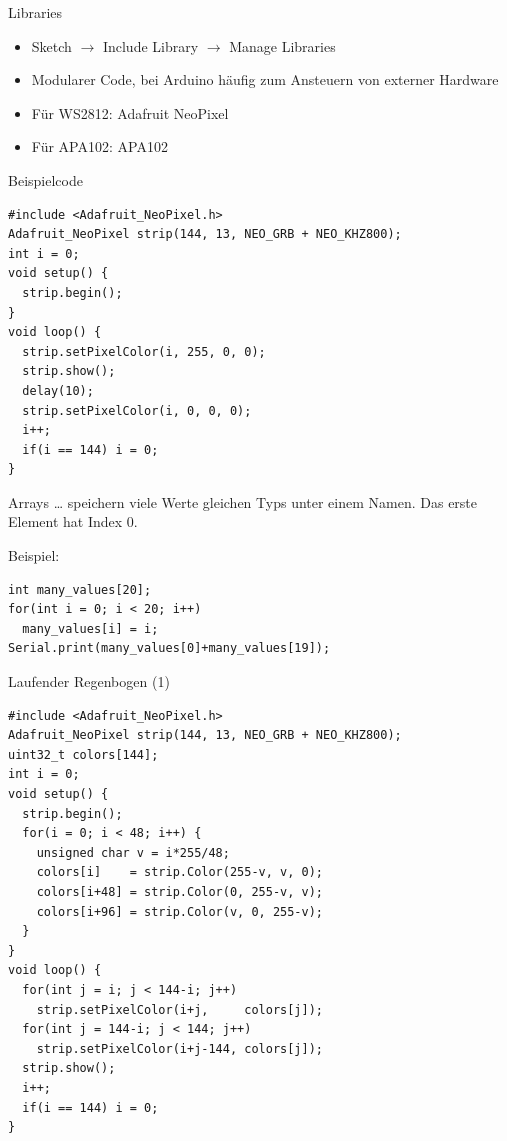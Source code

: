 \documentclass[bigger]{beamer}
\begin{document}
\begin{frame}[label={sec:orgd9b4a3e}]{Libraries}
\begin{itemize}
\item Sketch \(\rightarrow\) Include Library \(\rightarrow\) Manage Libraries
\item Modularer Code, bei Arduino häufig zum Ansteuern von externer Hardware
\item Für WS2812: Adafruit NeoPixel
\item Für APA102: APA102
\end{itemize}
\end{frame}

\begin{frame}[fragile,label={sec:orgb7befc6}]{Beispielcode}
 \begin{verbatim}
#include <Adafruit_NeoPixel.h>
Adafruit_NeoPixel strip(144, 13, NEO_GRB + NEO_KHZ800);
int i = 0;
void setup() {
  strip.begin();
}
void loop() {
  strip.setPixelColor(i, 255, 0, 0);
  strip.show();
  delay(10);
  strip.setPixelColor(i, 0, 0, 0);
  i++;
  if(i == 144) i = 0;
}
\end{verbatim}
\end{frame}

\begin{frame}[fragile,label={sec:org7bba636}]{Arrays}
 \ldots{} speichern viele Werte gleichen Typs unter einem Namen. Das erste
Element hat Index 0.

Beispiel:
\begin{verbatim}
int many_values[20];
for(int i = 0; i < 20; i++)
  many_values[i] = i;
Serial.print(many_values[0]+many_values[19]);
\end{verbatim}
\end{frame}

\begin{frame}[fragile,label={sec:org8318b75}]{Laufender Regenbogen (1)}
\begin{verbatim}
#include <Adafruit_NeoPixel.h>
Adafruit_NeoPixel strip(144, 13, NEO_GRB + NEO_KHZ800);
uint32_t colors[144];
int i = 0;
void setup() {
  strip.begin();
  for(i = 0; i < 48; i++) {
    unsigned char v = i*255/48;
    colors[i]    = strip.Color(255-v, v, 0);
    colors[i+48] = strip.Color(0, 255-v, v);
    colors[i+96] = strip.Color(v, 0, 255-v);
  }
}
void loop() {
  for(int j = i; j < 144-i; j++)
    strip.setPixelColor(i+j,     colors[j]);
  for(int j = 144-i; j < 144; j++)
    strip.setPixelColor(i+j-144, colors[j]);
  strip.show();
  i++;
  if(i == 144) i = 0;
}
\end{verbatim}
\end{frame}
\end{document}
